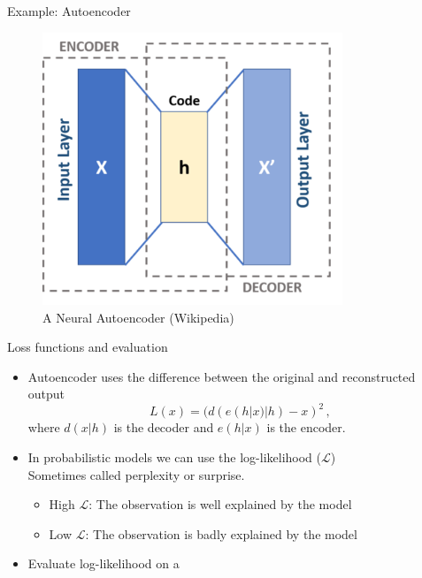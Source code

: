 \documentclass[10pt]{beamer}
\begin{document}
\begin{frame}{Example: Autoencoder}

\begin{figure}[h]
\centering
\includegraphics[width=0.8\textwidth]{fig/440px-Autoencoder_schema.png}
\caption{A Neural Autoencoder (Wikipedia)}
\end{figure}

\end{frame}

\begin{frame}{Loss functions and evaluation}
\begin{itemize}
\item Autoencoder uses the difference between the original and reconstructed output
\[
L(x) = (d(e(h|x)|h) - x)^2\,,
\]
where $d(x|h)$ is the decoder and $e(h|x)$ is the encoder.\pause
\item In probabilistic models we can use the log-likelihood ($\mathcal{L}$) \\ Sometimes called {\color{uured} perplexity} or {\color{uured} surprise}.
\begin{itemize}
\item {\color{uured} High} $\mathcal{L}$: The observation is {\color{uured} well} explained by the model
\item {\color{uured} Low} $\mathcal{L}$: The observation is {\color{uured} badly} explained by the model
\end{itemize}
\item Evaluate log-likelihood on a 
\end{itemize}

\end{frame}
\end{document}
